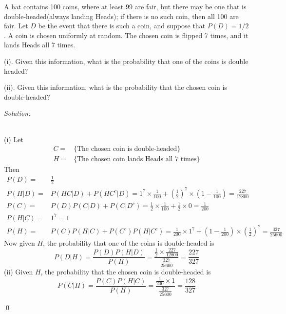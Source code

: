 \documentclass[12pt]{article}
\newenvironment{problem}[2][Problem]{\begin{trivlist}
\item[\hskip \labelsep {\bfseries #1}\hskip \labelsep {\bfseries #2.}]}{\end{trivlist}}
\newenvironment{sol}
    {\emph{Solution:}
    }
    {
    \qed
    }
\begin{document}
\begin{problem}{6}
A hat contains 100 coins, where at least 99 are fair, but there may be one that is double-headed(always
landing Heads); if there is no such coin, then all 100 are fair. Let $D$ be the event that there is such a coin, and suppose that $P(D) = 1/2$. A coin is chosen uniformly at random. The chosen coin is flipped 7 times, and it lands Heads all 7 times.

(i). Given this information, what is the probability that one of the coins is double headed?

(ii). Given this information, what is the probability that the chosen coin is double-headed?
\end{problem}
\begin{sol}
\\(i) Let
\begin{align*}
C=&\{\text{The chosen coin is double-headed}\}\\
H=&\{\text{The chosen coin lands Heads all 7 times}\}
\end{align*}
Then
\begin{align*}
P(D)=&\frac{1}{2}\\
P(H|D)=&P(HC|D)+P(HC^c|D)=1^7\times\frac{1}{100}+(\frac{1}{2})^7\times(1-\frac{1}{100})=\frac{227}{12800}\\
P(C)=&P(D)P(C|D)+P(C|D^c)=\frac{1}{2}\times\frac{1}{100}+\frac{1}{2}\times0=\frac{1}{200}\\
P(H|C)=&1^7=1\\
P(H)=&P(C)P(H|C)+P(C^c)P(H|C^c)=\frac{1}{200}\times1^7+(1-\frac{1}{200})\times(\frac{1}{2})^7=\frac{327}{25600}
\end{align*}
Now given $H$, the probability that one of the coins is double-headed is
\[
P(D|H)=\frac{P(D)P(H|D)}{P(H)}=\frac{\frac{1}{2}\times\frac{227}{12800}}{\frac{327}{25600}}=\frac{227}{327}
\]
(ii) Given $H$, the probability that the chosen coin is double-headed is
\[
P(C|H)=\frac{P(C)P(H|C)}{P(H)}=\frac{\frac{1}{200}\times1}{\frac{327}{25600}}=\frac{128}{327}
\]
\end{sol}
\end{document}
